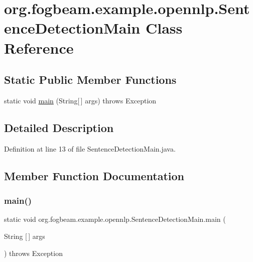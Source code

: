 \hypertarget{classorg_1_1fogbeam_1_1example_1_1opennlp_1_1_sentence_detection_main}{}\section{org.\+fogbeam.\+example.\+opennlp.\+Sentence\+Detection\+Main Class Reference}
\label{classorg_1_1fogbeam_1_1example_1_1opennlp_1_1_sentence_detection_main}
\subsection*{Static Public Member Functions}
\begin{DoxyCompactItemize}
\item 
static void \hyperlink{classorg_1_1fogbeam_1_1example_1_1opennlp_1_1_sentence_detection_main_ac9dc50e787e53db95a38e87b633ceea9}{main} (String\mbox{[}$\,$\mbox{]} args)  throws Exception 	
\end{DoxyCompactItemize}


\subsection{Detailed Description}


Definition at line 13 of file Sentence\+Detection\+Main.\+java.



\subsection{Member Function Documentation}
\hypertarget{classorg_1_1fogbeam_1_1example_1_1opennlp_1_1_sentence_detection_main_ac9dc50e787e53db95a38e87b633ceea9}{}\label{classorg_1_1fogbeam_1_1example_1_1opennlp_1_1_sentence_detection_main_ac9dc50e787e53db95a38e87b633ceea9} 
\subsubsection{\texorpdfstring{main()}{main()}}
{\footnotesize\ttfamily static void org.\+fogbeam.\+example.\+opennlp.\+Sentence\+Detection\+Main.\+main (\begin{DoxyParamCaption}\item[{String \mbox{[}$\,$\mbox{]}}]{args }\end{DoxyParamCaption}) throws Exception\hspace{0.3cm}{\ttfamily [static]}}



